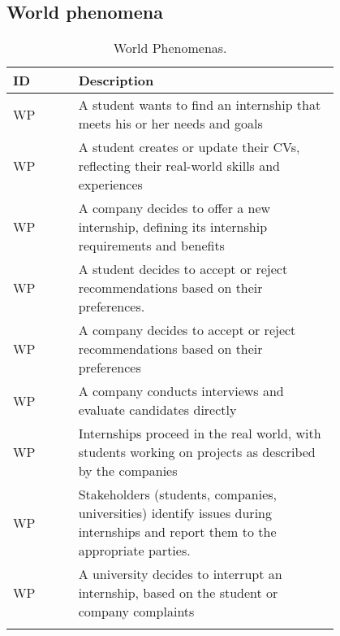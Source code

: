 \subsection{World phenomena}
\label{subsec:world_phenomena}%
\setcounter{wp}{1}
\newcommand{\cwp}{\thewp\stepcounter{wp}}
\begin{center}
    \renewcommand{\arraystretch}{2}
    \begin{longtable}{ l p{0.8\linewidth} } 
        \hline
        \textbf{ID} & \textbf{Description}                                                \\
        \hline
        WP\cwp      & A student wants to find an internship that meets his or her needs and goals\\
        \hline
        WP\cwp      & A student creates or update their CVs, reflecting their real-world skills and experiences   \\
        \hline
        WP\cwp      & A company decides to offer a new internship, defining its internship requirements and benefits \\
        \hline
        WP\cwp      & A student decides to accept or reject recommendations based on their preferences.          \\
        \hline
        WP\cwp      & A company decides to accept or reject recommendations based on their preferences                 \\
        \hline
        WP\cwp      & A company conducts interviews and evaluate candidates directly                   \\
        \hline
        WP\cwp      & Internships proceed in the real world, with students working on projects as described by the companies                                            \\
        \hline
        WP\cwp      & Stakeholders (students, companies, universities) identify issues during internships and report them to the appropriate parties.      \\
        \hline
        WP\cwp      & A university decides to interrupt an internship, based on the student or company complaints                       \\
        \hline
        \caption{World Phenomenas.}
        \label{tab:worldph_tab}%
    \end{longtable}
\end{center}

